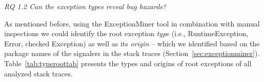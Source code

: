 
\bigskip


\bigskip
\bigskip
\bigskip
\bigskip
\bigskip
\bigskip
\noindent\emph{RQ 1.2 Can the exception types reveal bug hazards?}

\bigskip

As mentioned before, using the ExceptionMiner tool in combination with manual inspections we could identify
the root exception \emph{type} (i.e., RuntimeException, Error, checked Exception) as well as its \emph{origin} -- which we
identified based on the package names of the signalers in the stack traces (Section~\ref{sec:exceptionminer}).
Table~\ref{tab:typeroottab} presents the types and origins of root exceptions of all analyzed stack traces.


